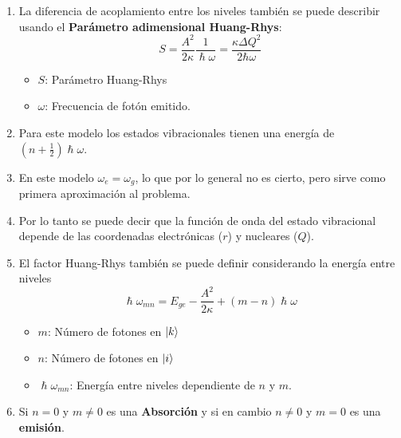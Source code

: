 \documentclass[aps,rmp,reprint,longbibliography]{revtex4-1}
\begin{document}
\begin{enumerate}
\begin{itemize}
\end{itemize}
\item La diferencia de acoplamiento entre los niveles también se puede describir usando el \textbf{Parámetro adimensional Huang-Rhys}:
\begin{equation}\label{eq17} S=\frac{A^2}{2\kappa}\frac{1}{\hslash\omega}=\frac{\kappa\Delta Q^2}{2\hbar\omega}\end{equation}
\begin{itemize}
    \item $S$: Parámetro Huang-Rhys
    \item $\omega$: Frecuencia de fotón emitido. 
\end{itemize}
\item Para este modelo los estados vibracionales tienen una energía de $(n+\frac{1}{2})\hslash\omega$.
\item En este modelo $\omega_e=\omega_g$, lo que por lo general no es cierto, pero sirve como primera aproximación al problema.
\item Por lo tanto se puede decir que la función de onda del estado vibracional depende de las coordenadas electrónicas (\textbf{$r$}) y nucleares (\textbf{$Q$}).
\item El factor Huang-Rhys también se puede definir considerando la energía entre niveles
\begin{equation}\label{eq18}\hslash \omega_{mn}=E_{ge}-\frac{A^2}{2\kappa}+(m-n)\hslash\omega \end{equation}
\begin{itemize}
    \item $m$: Número de fotones en $\ket{k}$
    \item $n$: Número de fotones en $\ket{i}$
    \item $\hslash\omega_{mn}$: Energía entre niveles dependiente de $n$ y $m$.  
\end{itemize}
 
\item Si $n=0$ y $m\neq 0$ es una \textbf{Absorción} y si en cambio $n\neq 0$ y $m=0$ es una \textbf{emisión}.
\end{enumerate}
\end{document}
